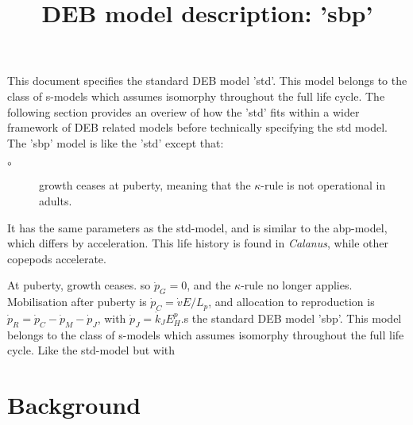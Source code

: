 \documentclass{article}
\title{DEB model description: 'sbp'}
\begin{document}
\maketitle

This document specifies the standard DEB model 'std'.
This model belongs to the class of s-models which assumes isomorphy throughout the full life cycle.
The following section provides an overiew of how the 'std' fits within a wider framework of DEB related models before technically specifying the std model.
The 'sbp' model is like the 'std' except that: 
\begin{description}
  \item[$\circ$] growth ceases at puberty, meaning that the $\kappa$-rule is not operational in adults.   
\end{description}
It has the same parameters as the std-model, and is similar to the abp-model, which differs by acceleration.
This life history is found in \emph{Calanus}, while other copepods accelerate. 

At puberty, growth ceases. so $\dot{p}_G = 0$, and the $\kappa$-rule no longer applies. 
Mobilisation after puberty is $\dot{p}_C = \dot{v} E/ L_p$, 
  and allocation to reproduction is $\dot{p}_R = \dot{p}_C - \dot{p}_M - \dot{p}_J$, with $\dot{p}_J = \dot{k}_J E_H^p$.s the standard DEB model 'sbp'.
This model belongs to the class of s-models which assumes isomorphy throughout the full life cycle.
Like the std-model but with 

\section{Background}







\end{document}
